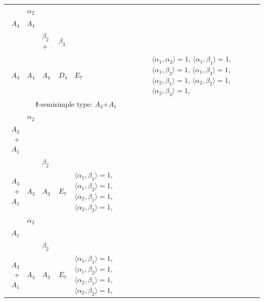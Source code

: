 \documentclass[12pt]{report}
\begin{document}
\begin{appendix}
{\begin{longtable}{rcl p{1cm}p{1cm}p{3cm} }
\\
\begin{tabular}{cc}$\alpha_1$+ & $\alpha_2$\\\tiny{ $A_4$ } & \tiny{ $A_4$ }\end{tabular} &\begin{tabular}{c} = \\~ \end{tabular} & \begin{tabular}{ccc}$\beta_1$+ & $\beta_2$+ & $\beta_3$\\\tiny{ $A_4$ } & \tiny{ $A_4$ } & \tiny{ $A_4$ }\end{tabular} & $D_4$ & $E_7$ & $\langle\alpha_1, \alpha_2\rangle=1$,  $\langle\alpha_1, \beta_1\rangle=1$, $\langle\alpha_1, \beta_2\rangle=1$, $\langle\alpha_1, \beta_3\rangle=1$, $\langle\alpha_2, \beta_1\rangle=1$, $\langle\alpha_2, \beta_2\rangle=1$, $\langle\alpha_2, \beta_3\rangle=1$, 
\\
\hline\multicolumn{5}{c}{$\mathfrak{k}$-semisimple type: $A_3$+$A_1$}\\
\hline\hline\begin{tabular}{cc}$\alpha_1$+ & $\alpha_2$\\\tiny{ $A_3$+$A_1$ } & \tiny{  }\end{tabular} &\begin{tabular}{c} = \\~ \end{tabular} & \begin{tabular}{cc}$\beta_1$+ & $\beta_2$\\\tiny{ $A_3$+$A_1$ } & \tiny{ $A_3$ }\end{tabular} & $A_3$ & $E_7$ &  $\langle\alpha_1, \beta_1\rangle=1$, $\langle\alpha_1, \beta_2\rangle=1$, $\langle\alpha_2, \beta_1\rangle=1$, $\langle\alpha_2, \beta_2\rangle=1$, 
\\
\begin{tabular}{cc}$\alpha_1$+ & $\alpha_2$\\\tiny{ $A_1$ } & \tiny{  }\end{tabular} &\begin{tabular}{c} = \\~ \end{tabular} & \begin{tabular}{cc}$\beta_1$+ & $\beta_2$\\\tiny{ $A_3$+$A_1$ } & \tiny{ $A_3$ }\end{tabular} & $A_3$ & $E_7$ &  $\langle\alpha_1, \beta_1\rangle=1$, $\langle\alpha_1, \beta_2\rangle=1$, $\langle\alpha_2, \beta_1\rangle=1$, $\langle\alpha_2, \beta_2\rangle=1$, 

\end{longtable}}
\end{appendix}
\end{document}
